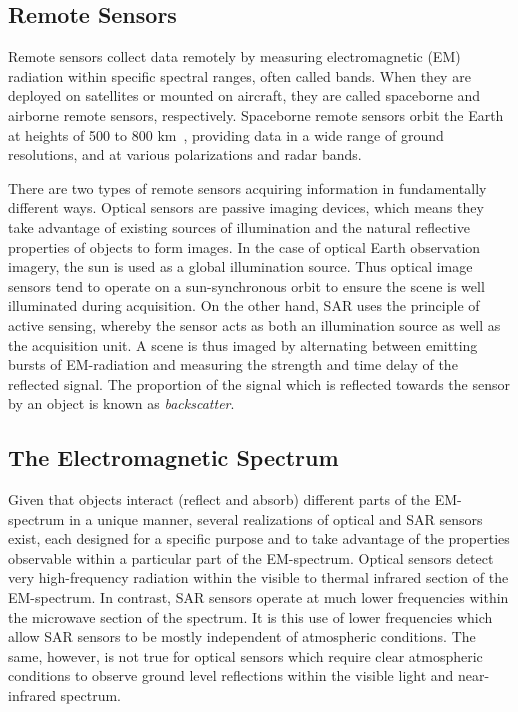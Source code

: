 \subsection{Remote Sensors}
Remote sensors collect data remotely by measuring electromagnetic (EM) radiation within specific spectral ranges,  often called bands. 
When they are deployed on satellites or mounted on aircraft, they are called spaceborne and airborne remote sensors, respectively.
 Spaceborne remote sensors orbit the Earth at heights of 500 to 800 km~\citep{everaerts2005pegasus}, providing data in a wide range of ground resolutions, and at various polarizations and radar bands. 

There are two types of remote sensors acquiring information in fundamentally different ways.
Optical sensors are passive imaging devices, which means they take advantage of existing sources of illumination and the natural reflective properties of objects to form
images. 
In the case of optical Earth observation imagery, the sun is used as a global illumination source. 
Thus optical image sensors tend to operate on a sun-synchronous orbit to ensure the scene is well illuminated during acquisition. 
On the other hand, SAR uses the principle of active sensing, whereby the sensor acts as both an illumination source as well as the acquisition unit. 
A scene is thus imaged by alternating between emitting bursts of EM-radiation and measuring the strength and time delay of the reflected signal. 
The proportion of the signal which is reflected towards the sensor by an object is known as \textit{backscatter}.
\subsection{The Electromagnetic Spectrum}
Given that objects interact (reflect and absorb) different parts of the EM-spectrum in a unique manner, several realizations of optical and SAR sensors exist, each designed for
a specific purpose and to take advantage of the properties observable within a particular part of the EM-spectrum.
Optical sensors detect very high-frequency radiation within the visible to thermal infrared section of the EM-spectrum.
In contrast, SAR sensors operate at much lower frequencies within the microwave section of the spectrum.
It is this use of lower frequencies which allow SAR sensors to be mostly independent of atmospheric conditions.
The same, however, is not true for optical sensors which require clear atmospheric conditions to observe ground level reflections within the visible light and near-infrared spectrum.

